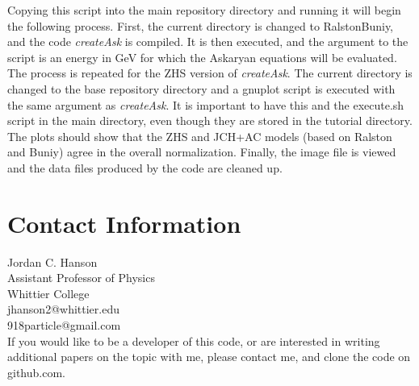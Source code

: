 \documentclass[10pt]{article}
\begin{document}
Copying this script into the main repository directory and running it will begin the following process.  First, the current directory is changed to RalstonBuniy, and the code \textit{createAsk} is compiled.  It is then executed, and the argument to the script is an energy in GeV for which the Askaryan equations will be evaluated.  The process is repeated for the ZHS version of \textit{createAsk}.  The current directory is changed to the base repository directory and a gnuplot script is executed with the same argument as \textit{createAsk}.  It is important to have this and the execute.sh script in the main directory, even though they are stored in the tutorial directory.  The plots should show that the ZHS and JCH+AC models (based on Ralston and Buniy) agree in the overall normalization.  Finally, the image file is viewed and the data files produced by the code are cleaned up.

\section{Contact Information}

Jordan C. Hanson \\
Assistant Professor of Physics \\
Whittier College \\
jhanson2@whittier.edu \\
918particle@gmail.com \\

If you would like to be a developer of this code, or are interested in writing additional papers on the topic with me, please contact me, and clone the code on github.com.
\end{document}
